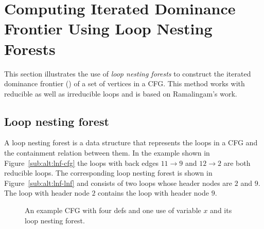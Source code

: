 {\begin{algorithm}
\end{algorithm}

%
%


\section{Computing Iterated Dominance Frontier Using Loop Nesting Forests}
\label{section:alternative_ssa_construction_algorithms:loop}
This section illustrates the use of \emph{loop nesting forests} to construct 
the iterated dominance frontier (\iDF) of a set of vertices in a CFG. This 
method works with reducible as well as irreducible loops and is based on 
Ramalingam's work.


\subsection{Loop nesting forest}%
A loop nesting forest
is a data structure that represents the loops in a CFG and the containment relation between them. 
In the example shown in Figure~\ref{sub:alt:lnf-cfg} the loops with back edges $11 \rightarrow 9$ and $12 \rightarrow 2$ are both reducible loops.
The corresponding loop nesting forest is shown in Figure~\ref{sub:alt:lnf-lnf} and consists of two loops whose header nodes are $2$ and $9$.
The loop with header node $2$ contains the loop with header node $9$.

    \begin{figure}[t]
    \hfill
    \hfill
    \hfill\null
    \caption{An example CFG with four defs and one use of variable $x$ and its loop nesting forest.}
    \label{fig:lnf}
    \end{figure} 


}
